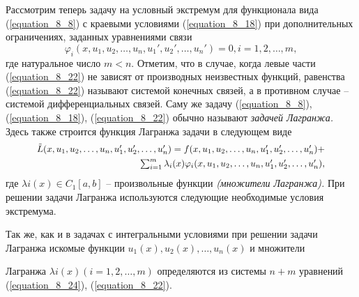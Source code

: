 	Рассмотрим теперь задачу на условный экстремум для функционала вида (\ref{equation_8_8}) с краевыми условиями (\ref{equation_8_18}) при дополнительных ограничениях, заданных уравнениями связи
	\begin{equation}
	\label{equation_8_22}
	 	\varphi_i(x,u_1, u_2, \ldots, u_n, u_1', u_2', \ldots, u_n') = 0, i = 1, 2, \ldots, m,
	\end{equation}
	где натуральное число $m<n$. Отметим, что в случае, когда левые части (\ref{equation_8_22}) не зависят от производных неизвестных функций, равенства (\ref{equation_8_22}) называют системой конечных связей, а в противном случае – системой дифференциальных связей. Саму же задачу (\ref{equation_8_8}), (\ref{equation_8_18}), (\ref{equation_8_22}) обычно называют {\it задачей Лагранжа.} Здесь также строится функция Лагранжа задачи в следующем виде
	\begin{equation}
	\label{equation_8_23}
			\begin{aligned}
				\scalebox{0.95}{$\tilde{L}(x,u_1, u_2, \ldots, u_n, u_1', u_2', \ldots, u_n') = f(x,u_1, u_2, \ldots, u_n, u_1', u_2', \ldots, u_n') + $}\\
				\centering
				\scalebox{0.95}{$\sum_{i=1}^{m} \lambda_i(x) \varphi_i (x,u_1, u_2, \ldots, u_n, u_1', u_2', \ldots, u_n'),$}
			\end{aligned}
	\end{equation}
	где $\lambda i(x)\in C_1[a, b]$ – произвольные функции {\it (множители Лагранжа).} При решении задачи Лагранжа используются следующие необходимые условия экстремума.


	Так же, как и в задачах с интегральными условиями при решении задачи Лагранжа искомые функции $u_1(x), u_2(x), \ldots, u_n(x)$ и множители

	\newpage
	\noindent
		Лагранжа $\lambda i(x) (i=1, 2, \ldots, m)$ определяются из системы $n+m$ уравнений (\ref{equation_8_24}), (\ref{equation_8_22}).

